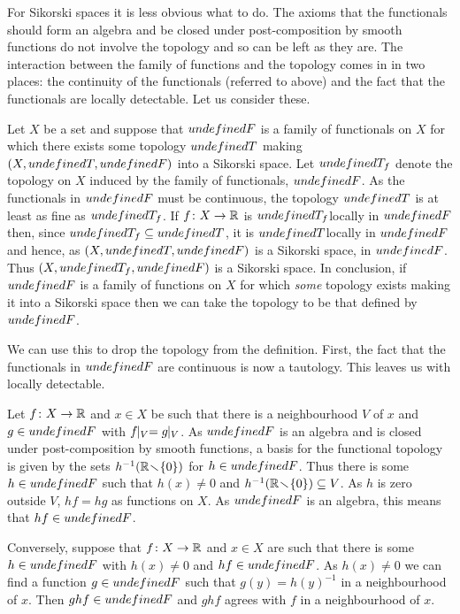 \documentclass[%
a4paper,%
arxiv,%
defaults
]{myclass}
\begin{document}
For Sikorski spaces it is less obvious what to do.
The axioms that the functionals should form an algebra and be closed under post\hyp{}composition by smooth functions do not involve the topology and so can be left as they are.
The interaction between the family of functions and the topology comes in in two places: the continuity of the functionals (referred to above) and the fact that the functionals are locally detectable.
Let us consider these.

Let \(X\) be a set and suppose that \(\m{F}\) is a family of functionals on \(X\) for which there exists some topology \(\m{T}\) making \((X, \m{T}, \m{F})\) into a Sikorski space.
Let \(\m{T}_f\) denote the topology on \(X\) induced by the family of functionals, \(\m{F}\).
As the functionals in \(\m{F}\) must be continuous, the topology \(\m{T}\) is at least as fine as \(\m{T}_f\).
If \(f \colon X \to \mathbb{R}\) is \(\m{T}_f\)\enhyp{}locally in \(\m{F}\) then, since \(\m{T}_f \subseteq \m{T}\), it is \(\m{T}\)\enhyp{}locally in \(\m{F}\) and hence, as \((X, \m{T}, \m{F})\) is a Sikorski space, in \(\m{F}\).
Thus \((X, \m{T}_f, \m{F})\) is a Sikorski space.
In conclusion, if \(\m{F}\) is a family of functions on \(X\) for which \emph{some} topology exists making it into a Sikorski space then we can take the topology to be that defined by \(\m{F}\).

We can use this to drop the topology from the definition.
First, the fact that the functionals in \(\m{F}\) are continuous is now a tautology.
This leaves us with locally detectable.

Let \(f \colon X \to \mathbb{R}\) and \(x \in X\) be such that there is a neighbourhood \(V\) of \(x\) and \(g \in \m{F}\) with \(f \!\!\mid_V = g \!\!\mid_V\).
As \(\m{F}\) is an algebra and is closed under post\hyp{}composition by smooth functions, a basis for the functional topology is given by the sets \(h^{-1}(\mathbb{R} \!\smallsetminus\! \{0\})\) for \(h \in \m{F}\).
Thus there is some \(h \in \m{F}\) such that \(h(x) \ne 0\) and \(h^{-1}(\mathbb{R} \!\smallsetminus\! \{0\}) \subseteq V\).
As \(h\) is zero outside \(V\), \(h f = h g\) as functions on \(X\).
As \(\m{F}\) is an algebra, this means that \(h f \in \m{F}\).

Conversely, suppose that \(f \colon X \to \mathbb{R}\) and \(x \in X\) are such that there is some \(h \in \m{F}\) with \(h(x) \ne 0\) and \(h f \in \m{F}\).
As \(h(x) \ne 0\) we can find a function \(g \in \m{F}\) such that \(g(y) = h(y)^{-1}\) in a neighbourhood of \(x\).
Then \(g h f \in \m{F}\) and \(g h f\) agrees with \(f\) in a neighbourhood of \(x\).
\end{document}
